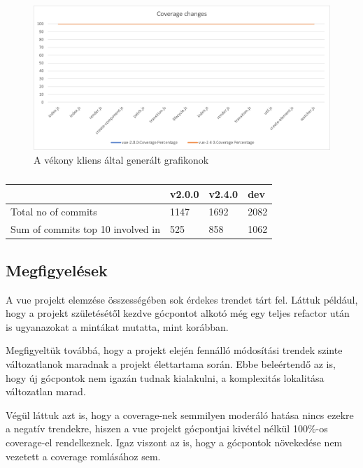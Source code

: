 \begin{figure}[H]
    \centering
    \includegraphics[width=1\textwidth]{images/vue/vue-all-coverage.png}
    \caption{A vékony kliens által generált grafikonok}
    \label{fig:vue-all-coverage}
\end{figure}

\begin{table}[h]
    \centering
    \begin{tabular}{l|l|l|l}
                                          & v2.0.0 & v2.4.0 & dev  \\ \hline
        Total no of commits               & 1147   & 1692   & 2082 \\
        Sum of commits top 10 involved in & 525    & 858    & 1062
    \end{tabular}
    \caption{}\label{tab:my-table}
\end{table}

\subsection{Megfigyelések}

A vue projekt elemzése összességében sok érdekes trendet tárt fel. Láttuk például, hogy a projekt születésétől kezdve gócpontot alkotó  még egy teljes refactor után is ugyanazokat a mintákat mutatta, mint korábban.

Megfigyeltük továbbá, hogy a projekt elején fennálló módosítási trendek szinte változatlanok maradnak a projekt élettartama során. Ebbe beleértendő az is, hogy új gócpontok nem igazán tudnak kialakulni, a komplexitás lokalitása változatlan marad.

Végül láttuk azt is, hogy a coverage-nek semmilyen moderáló hatása nincs ezekre a negatív trendekre, hiszen a vue projekt gócpontjai kivétel nélkül 100\%-os coverage-el rendelkeznek. Igaz viszont az is, hogy a gócpontok növekedése nem vezetett a coverage romlásához sem.
